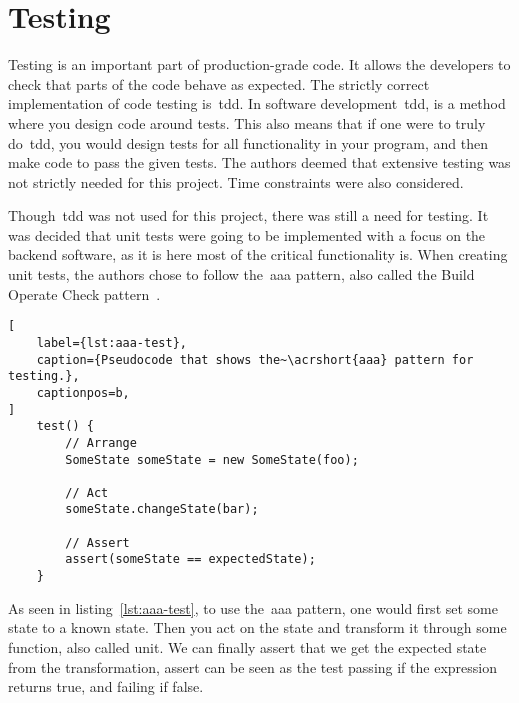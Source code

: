 \section{Testing}\label{sec:testing}
Testing is an important part of production-grade code.
It allows the developers to check that parts of the code behave as expected.
The strictly correct implementation of code testing is~\acrfull{tdd}.
In software development~\acrshort{tdd}, is a method where you design code around tests.
This also means that if one were to truly do~\acrshort{tdd}, you would design tests for all functionality
in your program, and then make code to pass the given tests.
The authors deemed that extensive testing was not strictly needed for this project.
Time constraints were also considered.

Though~\acrshort{tdd} was not used for this project, there was still a need for testing.
It was decided that unit tests were going to be implemented with a focus on the backend software, as
it is here most of the critical functionality is.
When creating unit tests, the authors chose to follow the~\acrfull{aaa} pattern, also called the Build Operate
Check pattern~\cite{clean-code}.


\begin{lstlisting}[
    label={lst:aaa-test},
    caption={Pseudocode that shows the~\acrshort{aaa} pattern for testing.},
    captionpos=b,
]
    test() {
        // Arrange
        SomeState someState = new SomeState(foo);

        // Act
        someState.changeState(bar);

        // Assert
        assert(someState == expectedState);
    }
\end{lstlisting}

As seen in listing~\ref{lst:aaa-test}, to use the~\acrshort{aaa} pattern,
one would first set some state to a known state.
Then you act on the state and transform it through some function, also called unit.
We can finally assert that we get the expected state from the transformation, assert can be seen
as the test passing if the expression returns true, and failing if false.
